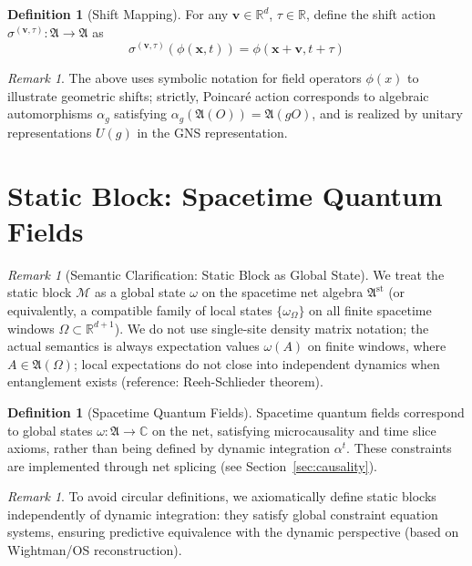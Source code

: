 \documentclass[11pt]{article}
\theoremstyle{definition}
\newtheorem{definition}[theorem]{Definition}
\theoremstyle{remark}
\newtheorem{remark}[theorem]{Remark}
\begin{document}
\begin{definition}[Shift Mapping]\label{def:shift}
For any \( \mathbf{v} \in \mathbb{R}^d \), \( \tau \in \mathbb{R} \), define the shift action \( \sigma^{(\mathbf{v},\tau)}: \mathfrak{A} \to \mathfrak{A} \) as
\[
\sigma^{(\mathbf{v},\tau)}(\phi(\mathbf{x},t)) = \phi(\mathbf{x} + \mathbf{v}, t + \tau)
\]
\end{definition}

\begin{remark}
The above uses symbolic notation for field operators \( \phi(x) \) to illustrate geometric shifts; strictly, Poincaré action corresponds to algebraic automorphisms \( \alpha_g \) satisfying \( \alpha_g(\mathfrak{A}(O))=\mathfrak{A}(gO) \), and is realized by unitary representations \( U(g) \) in the GNS representation.
\end{remark}

\section{Static Block: Spacetime Quantum Fields}\label{sec:static}

\begin{remark}[Semantic Clarification: Static Block as Global State]\label{rem:3.1}
We treat the static block \( \mathcal{M} \) as a global state \( \omega \) on the spacetime net algebra \( \mathfrak{A}^{\mathrm{st}} \) (or equivalently, a compatible family of local states \( \{\omega_\Omega\} \) on all finite spacetime windows \( \Omega \subset \mathbb{R}^{d+1} \)). We do not use single-site density matrix notation; the actual semantics is always expectation values \( \omega(A) \) on finite windows, where \( A \in \mathfrak{A}(\Omega) \); local expectations do not close into independent dynamics when entanglement exists (reference: Reeh-Schlieder theorem).
\end{remark}

\begin{definition}[Spacetime Quantum Fields]\label{def:spacetime}
Spacetime quantum fields correspond to global states \( \omega: \mathfrak{A} \to \mathbb{C} \) on the net, satisfying microcausality and time slice axioms, rather than being defined by dynamic integration \( \alpha^t \). These constraints are implemented through net splicing (see Section~\ref{sec:causality}).
\end{definition}

\begin{remark}\label{rem:3.2}
To avoid circular definitions, we axiomatically define static blocks independently of dynamic integration: they satisfy global constraint equation systems, ensuring predictive equivalence with the dynamic perspective (based on Wightman/OS reconstruction).
\end{remark}
\end{document}
